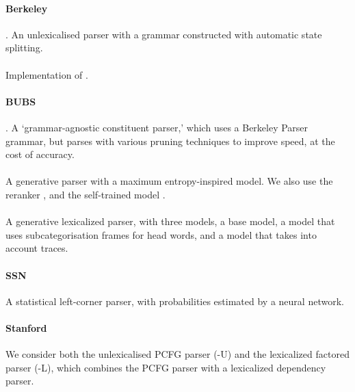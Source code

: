 \paragraph{Berkeley} \parencite{Petrov-etal:2006,Petrov-Klein:2007}.
An unlexicalised parser with a grammar constructed with automatic state splitting.

\paragraph{\textcite{Bikel:2004}} Implementation of \textcite{Collins:1997}.

\paragraph{BUBS} \parencite{Dunlop-Bodenstab-Roark:2011,Bodenstab-Dunlop-Hall-Roark:2011}.
A `grammar-agnostic constituent parser,' which uses a Berkeley Parser grammar, but parses with various pruning techniques to improve speed, at the cost of accuracy.

\paragraph{\textcite{Charniak:2000}}
A generative parser with a maximum entropy-inspired model.
We also use the reranker \parencite[-R;][]{Charniak-Johnson:2005}, and the self-trained model \parencite[-S;][]{McClosky-Charniak-Johnson:2006}.

\paragraph{\textcite{Collins:1997}}
A generative lexicalized parser, with three models, a base model, a model that uses subcategorisation frames for head words, and a model that takes into account traces.

\paragraph{SSN} \parencite{Henderson:2003,Henderson:2004}
A statistical left-corner parser, with probabilities estimated by a neural network.

\paragraph{Stanford} \parencite{Klein-Manning:2003:ACL,Klein-Manning:2003:NIPS}
We consider both the unlexicalised PCFG parser (-U) and the lexicalized factored parser (-L), which combines the PCFG parser with a lexicalized dependency parser. \\

